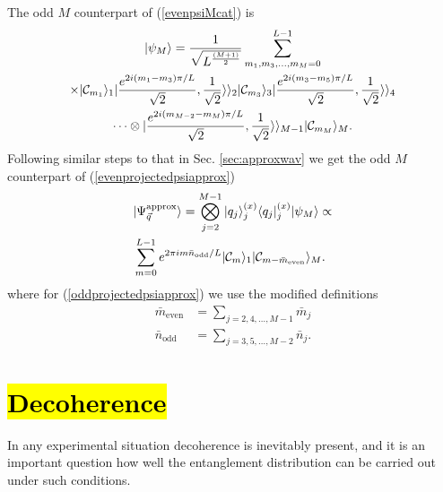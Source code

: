 \documentclass{WileyMSP-template}
\begin{document}
{The odd $ M $ counterpart of (\ref{evenpsiMcat}) is
%
\begin{multline}
| \psi_M \rangle=\frac{1}{\sqrt{L^{\frac{(M+1)}{2}}}}\sum_{m_1,m_3,\ldots,m_M=0}^{L-1} \\
\times | {\cal C}_{m_1}  \rangle_1  |\frac{e^{2 i(m_{1}-m_{3})\pi/L }}{\sqrt{2}},\frac{1}{\sqrt{2}}\rangle\rangle_2 | {\cal C}_{m_3} \rangle_3
|\frac{e^{2 i(m_{3}-m_{5})\pi/L }}{\sqrt{2}},\frac{1}{\sqrt{2}}\rangle\rangle_4  \\
\dots \otimes |\frac{e^{2 i(m_{M-2}-m_{M})\pi/L }}{\sqrt{2}},\frac{1}{\sqrt{2}}\rangle\rangle_{M-1} | {\cal C}_{m_{M}}  \rangle_{M} .
\label{oddpsiMcat}
\end{multline}
%
Following similar steps to that in Sec. \ref{sec:approxwav} we get the odd $ M $ counterpart of (\ref{evenprojectedpsiapprox})
%
\begin{align}
& | \Psi_{\vec{q}}^{\text{approx}} \rangle =  \bigotimes_{j=2}^{M-1}  |q_j \rangle_j^{(x)} \langle q_j |_j^{(x)}  |\psi_M \rangle \propto \nonumber \\
& \sum_{m=0}^{L-1} e^{2 \pi i m \bar{n}_{\text{odd}}/L } | {\cal C}_{m}  \rangle_1 | {\cal C}_{m - \bar{m}_{\text{even}}}  \rangle_M  .  \label{oddprojectedpsiapprox}
\end{align}
%
where for (\ref{oddprojectedpsiapprox}) we use the modified definitions
%
\begin{align}
\bar{m}_\text{even} & =
\sum_{j=2,4, \dots, M-1} \bar{m}_j  \nonumber \\
\bar{n}_{\text{odd}} & = \sum_{j=3,5,\dots, M-2} \bar{n}_j  .
\end{align}




\section{\hl{Decoherence}}
\label{sec:decoherence}

In any experimental situation decoherence is inevitably present, and it is an important
question how well the entanglement distribution can be carried out under such conditions.

}
\end{document}
